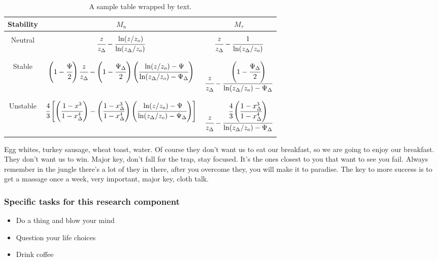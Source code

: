 \begin{table}
\label{table1}
\caption{A sample table wrapped by text.}
\begin{center}
\vspace{-10pt}
\scriptsize
\begin{tabular}{  c  c  c  }
\hline
\hline
Stability & $M_u$ & $M_{\tau}$ \\ 
\hline\hline\\
Neutral & $\cfrac{z}{z_\Delta} - \cfrac{\ln(z/z_o)}{\ln(z_\Delta/z_o)}$ & $\cfrac{z}{z_\Delta} - \cfrac{1}{\ln(z_\Delta/z_o)}$\\\\
\hline \\
Stable & $\left(1 - \cfrac{\Psi}{2}\right)\cfrac{z}{z_\Delta} - \left(1 - \cfrac{\Psi_\Delta}{2}\right)
\left(\cfrac{\ln(z/z_o)-\Psi}{\ln(z_\Delta/z_o)- \Psi_\Delta}\right)$ & $\cfrac{z}{z_\Delta} - \cfrac{\left(1 - \cfrac{\Psi_\Delta}{2}\right)}{\ln(z_\Delta/z_o) - \Psi_\Delta}$\\\\
\hline \\
Unstable & $\cfrac{4}{3}\left[\left(\cfrac{1-x^3}{1-x_{\Delta}^{4}}\right) -  \left(\cfrac{1-x_{\Delta}^3}{1 - x_{\Delta}^{4}}\right)\left(\cfrac{\ln(z/z_o)-\Psi}{\ln(z_\Delta/z_o)- \Psi_\Delta}\right)\right]$ & $\cfrac{z}{z_\Delta} - \cfrac{\cfrac{4}{3}\left(\cfrac{1-x_{\Delta}^3}{1 - x_{\Delta}^{4}}\right)}{\ln(z_\Delta/z_o) - \Psi_\Delta}$\\\\
\hline
\hline
\end{tabular}
\end{center}
\end{table}


Egg whites, turkey sausage, wheat toast, water. Of course they don't want us to eat our breakfast, so we are going to enjoy our breakfast. They don't want us to win. Major key, don't fall for the trap, stay focused.  It's the ones closest to you that want to see you fail. Always remember in the jungle there's a lot of they in there, after you overcome they, you will make it to paradise. The key to more success is to get a massage once a week, very important, major key, cloth talk.

\subsubsection{Specific tasks for this research component}
\begin{itemize}
\setlength\itemsep{0em}
\item Do a thing and blow your mind
\item Question your life choices
\item Drink coffee
\end{itemize}

